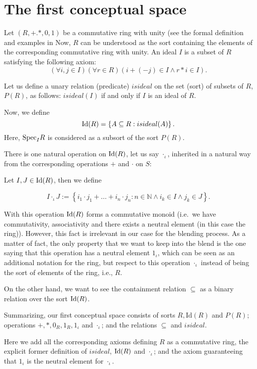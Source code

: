 \section{The first conceptual space}
Let $(R,+.*,0,1)$ be a commutative ring with unity (see the formal
definition and examples in \cite{eisenbud} Now, $R$ can be understood
as the sort containing the elements of the corresponding commutative
ring with unity.  An ideal $I$ is a subset of $R$ satisfying the
following axiom:
\[(\forall i,j\in I)(\forall r\in R)(i+(-j)\in I \wedge r*i\in I).\]

Let us define a unary relation (predicate) $isideal$
on the set (sort) of subsets of $R$, $P(R)$, as follows: $isideal(I)$
if and only if $I$ is an ideal of $R$.

Now, we define
\[{\rm Id}(R)=\left\{A\subseteq R: isideal(A) \right\}.\]
Here, ${\rm Spec}_IR$ is considered as a subsort of the sort $P(R)$.

There is one natural operation on ${\rm Id}(R)$, let us say
$\cdot_{\iota}$, inherited in a natural way from the corresponding
operations $+$ and $\cdot$ on $S$:

Let $I,J\in {\rm Id}(R)$, then we define 

\[I\cdot_{\iota} J:=\left\{i_1\cdot j_1+...+i_n\cdot j_n:n \in \mathbb{N} \wedge i_k\in I \wedge j_k\in J \right\}.\]

With this operation ${\rm Id}(R)$ forms a commutative monoid (i.e.\ we
have commutativity, associativity and there exists a neutral element
(in this case the ring)). However, this fact is irrelevant in our case
for the blending process. As a matter of fact, the only property that
we want to keep into the blend is the one saying that this operation
has a neutral element $1_{\iota}$, which can be seen as an additional
notation for the ring, but respect to this operation $\cdot_{\iota}$
instead of being the sort of elements of the ring, i.e., $R$.

On the other hand, we want to see the containment relation $\subseteq$
as a binary relation over the sort ${\rm Id}(R)$.

Summarizing, our first conceptual space consists of sorts $R,
\textrm{Id}(R)$ and $P(R)$; operations $+, *, 0_R, 1_R, 1_{\iota}$ and
$ \cdot_{\iota}$; and the relations $\subseteq$ and $isideal$.

Here we add all the corresponding axioms defining $R$ as a commutative ring, the explicit former definition of $isideal$, ${\rm Id}(R)$ and $\cdot_{\iota}$; and the axiom guaranteeing that  $1_{\iota}$ is the neutral element for $\cdot_{\iota}$.

